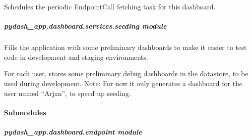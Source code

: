 \documentclass[letterpaper,10pt,english]{sphinxmanual}
\begin{document}

\begin{fulllineitems}
\label{\detokenize{pydash_app.dashboard.services.fetching:pydash_app.dashboard.services.fetching.schedule_periodic_dashboard_fetching}}
Schedules the periodic EndpointCall fetching task for this dashboard.

\end{fulllineitems}



\subparagraph{pydash\_app.dashboard.services.seeding module}
\label{\detokenize{pydash_app.dashboard.services.seeding:module-pydash_app.dashboard.services.seeding}}\label{\detokenize{pydash_app.dashboard.services.seeding:pydash-app-dashboard-services-seeding-module}}\label{\detokenize{pydash_app.dashboard.services.seeding::doc}}
Fills the application with some preliminary dashboards
to make it easier to test code in development and staging environments.

\begin{fulllineitems}
\label{\detokenize{pydash_app.dashboard.services.seeding:pydash_app.dashboard.services.seeding.seed}}
For each user, stores some preliminary debug dashboards in the datastore,
to be used during development.
Note: For now it only generates a dashboard for the user named “Arjan”, to speed up seeding.

\end{fulllineitems}



\paragraph{Submodules}
\label{\detokenize{pydash_app.dashboard:submodules}}

\subparagraph{pydash\_app.dashboard.endpoint module}
\label{\detokenize{pydash_app.dashboard.endpoint:module-pydash_app.dashboard.endpoint}}\label{\detokenize{pydash_app.dashboard.endpoint:pydash-app-dashboard-endpoint-module}}\label{\detokenize{pydash_app.dashboard.endpoint::doc}}
\end{document}
